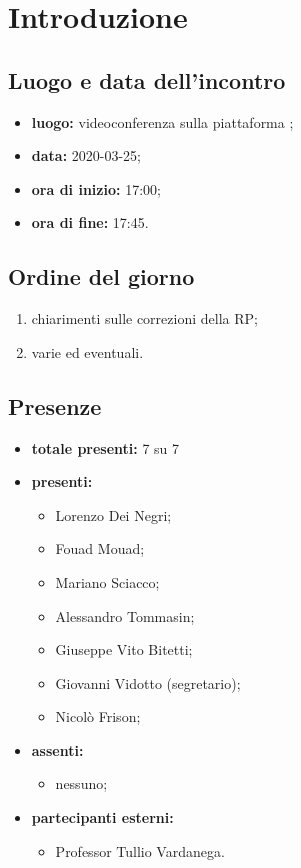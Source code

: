 \section*{Introduzione}

\subsection*{Luogo e data dell'incontro}
	\begin{itemize}
		\item \textbf{luogo:} videoconferenza sulla piattaforma ;
		\item \textbf{data:} 2020-03-25;
		\item \textbf{ora di inizio:} 17:00;
		\item \textbf{ora di fine:} 17:45.
	\end{itemize}

\subsection*{Ordine del giorno}
	\begin{enumerate}
		\item chiarimenti sulle correzioni della RP;
  		\item varie ed eventuali.
	\end{enumerate}

\subsection*{Presenze}
	\begin{itemize}
		\item \textbf{totale presenti:} 7 su 7
		\item \textbf{presenti: }
			\begin{itemize}
				\item Lorenzo Dei Negri;
				\item Fouad Mouad;
				\item Mariano Sciacco;
				\item Alessandro Tommasin;
				\item Giuseppe Vito Bitetti;
				\item Giovanni Vidotto (segretario);
				\item Nicolò Frison;
			\end{itemize}
		\item \textbf{assenti: }
			\begin{itemize}
				\item nessuno;
			\end{itemize}
		\item  \textbf{partecipanti esterni:}
			\begin{itemize}
				\item Professor Tullio Vardanega.
			\end{itemize}
	\end{itemize}


